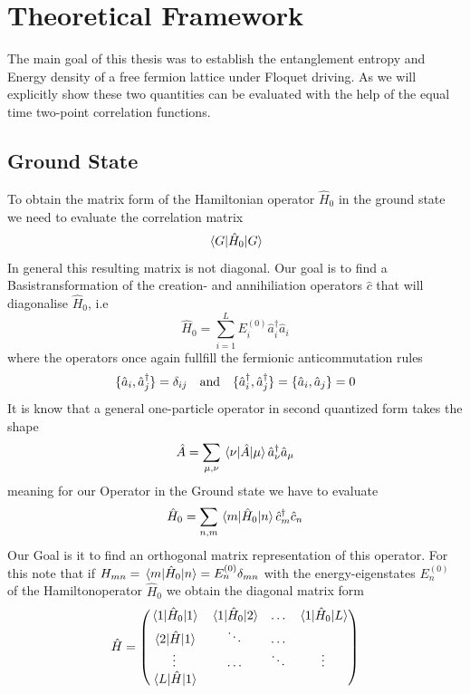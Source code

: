 \documentclass[11pt, a4paper]{article}
\theoremstyle{definition} %
\begin{document}
	\section{Theoretical Framework}
	The main goal of this thesis was to establish the entanglement entropy and Energy density of a free fermion lattice under Floquet driving. As we will explicitly show these two quantities can be evaluated with the help of the equal time two-point correlation functions.

	\subsection{Ground State}
	To obtain the matrix form of the Hamiltonian operator $\hat{H}_0$ in the ground state we need to evaluate the correlation matrix
	\begin{equation}
		\mel{G}{\hat{H}_0}{G}
	\end{equation}
	In general this resulting matrix is not diagonal. Our goal is to find a Basistransformation of the creation- and annihiliation operators $\hat{c}$ that will diagonalise $\hat{H}_0$, i.e
	\begin{equation}
		\hat{H}_0 = \sum_{i=1}^L E_i^{(0)} \hat{a}_i^\dagger \hat{a}_i
	\end{equation}
	where the operators once again fullfill the fermionic anticommutation rules
	\begin{equation}
		\{ \hat{a}_i,\hat{a}_j^\dagger \} = \delta_{ij} \qq{and} \{\hat{a}_i^\dagger, \hat{a}_j^\dagger\} = \{\hat{a}_i,\hat{a}_j  \} =0
	\end{equation}
	It is know that a general one-particle operator in second quantized form takes the shape
	\begin{equation}
		\hat{A} = \sum_{\mu, \nu} \mel{\nu}{\hat{A}}{\mu} \hat{a}_\nu^\dagger \hat{a}_\mu
	\end{equation}
	meaning for our Operator in the Ground state we have to evaluate
	\begin{equation}
		\hat{H}_0 = \sum_{n, m} \mel{m}{\hat{H}_0}{n} \hat{c}_m^\dagger \hat{c}_n
	\end{equation}
	Our Goal is it to find an orthogonal matrix representation of this operator. For this note that if $H_{mn} = \mel{m}{\hat{H}_0}{n} = E_n^{(0)} \delta_{mn} $ with the energy-eigenstates $E_n^{(0)}$ of the Hamiltonoperator $\hat{H}_0$ we obtain the diagonal matrix form
	\begin{equation}
	\hat{H} = 
	\begin{pmatrix}
 		\mel{1}{\hat{H}_0}{1} & \mel{1}{\hat{H}_0}{2} & \dots & \mel{1}{\hat{H}_0}{L} \\
 		\mel{2}{\hat{H}}{1} & \ddots &\dots \\
 		\vdots & \dots & \ddots & \vdots \\
 		\mel{L}{\hat{H}}{1}
 	\end{pmatrix}
	\end{equation}
\end{document}
